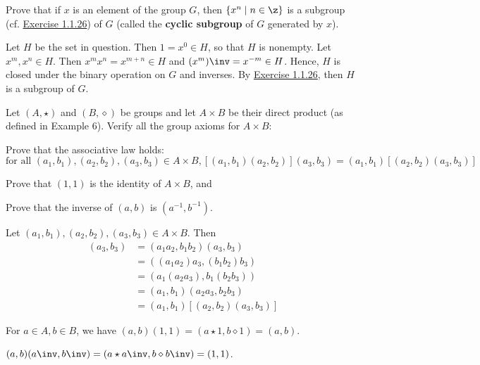 \begin{specialexercise} \label{ex1.1.27}
    Prove that if $x$ is an element of the group $G$, then $\{x^n \mid n \in \z \}$ is a subgroup (cf. \hyperref[ex1.1.26]{Exercise 1.1.26}) of $G$ (called the \textbf{cyclic subgroup} of $G$ generated by $x$).
\end{specialexercise}

\begin{sol}
    Let $H$ be the set in question. Then $1 = x^0 \in H$, so that $H$ is nonempty. Let $x^m, x^n \in H$. Then $x^m x^n = x^{m + n} \in H$ and $(x^m)\inv = x^{-m} \in H$. Hence, $H$ is closed under the binary operation on $G$ and inverses. By \hyperref[ex1.1.26]{Exercise 1.1.26}, then $H$ is a subgroup of $G$.
\end{sol}

\begin{exercise}\label{ex1.1.28}
    Let $(A, \star)$ and $(B, \diamond)$ be groups and let $A \times B$ be their direct product (as defined in Example 6). Verify all the group axioms for $A \times B$:
    \begin{subproblems}
        \item[(a)] Prove that the associative law holds:
        $$\text{for all } (a_1, b_1), (a_2, b_2), (a_3, b_3) \in A \times B,
        [(a_1, b_1)(a_2, b_2)](a_3, b_3) = (a_1, b_1)[(a_2, b_2)(a_3, b_3)]$$
        \item Prove that $(1, 1)$ is the identity of $A \times B$, and
        \item Prove that the inverse of $(a, b)$ is $(a^{-1}, b^{-1})$.
    \end{subproblems}
\end{exercise}

\begin{solalph}
    \item Let $(a_1, b_1), (a_2, b_2), (a_3, b_3) \in A \times B$. Then
    \begin{align*}
        [(a_1, b_1)(a_2, b_2)](a_3, b_3) & = (a_1a_2, b_1b_2)(a_3, b_3) \\
        & = ((a_1a_2)a_3, (b_1b_2)b_3) \\
        & = (a_1(a_2a_3), b_1(b_2b_3)) \\
        & = (a_1,b_1)(a_2a_3, b_2b_3) \\
        & = (a_1, b_1)[(a_2, b_2)(a_3, b_3)]
    \end{align*}
    \item For $a \in A, b \in B$, we have $(a, b)(1, 1) = (a \star 1, b \diamond 1) = (a, b)$.
    \item $(a, b)(a\inv, b\inv) = (a \star a\inv, b \diamond b\inv) = (1, 1)$.
\end{solalph}

